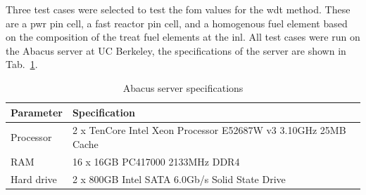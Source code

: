 Three test cases were selected to test the \gls{fom} values for the
\gls{wdt} method. These are a \gls{pwr} pin cell, a fast reactor pin
cell, and a homogenous fuel element based on the composition of the
\gls{treat} fuel elements at the \gls{inl}. All test cases were run on
the Abacus server at UC Berkeley, the specifications of the server are
shown in Tab.~\ref{tab:abacus}.
\begin{table}[hbtp]
  \centering
  \caption{Abacus server specifications}
  \begin{tabular}{ll}
    \toprule
    \textrm{Parameter} & \textrm{Specification} \\ \midrule
    Processor & 2 x TenCore Intel Xeon Processor E5­2687W v3 3.10GHz
                 25MB Cache \\
    RAM & 16 x 16GB PC4­17000 2133MHz DDR4 \\
    Hard drive & 2 x 800GB Intel SATA 6.0Gb/s Solid State Drive
          \\ \bottomrule
  \end{tabular}
  \label{tab:abacus}
\end{table}

